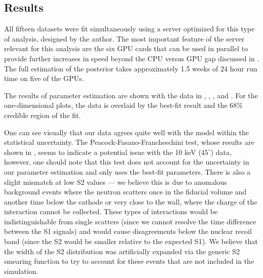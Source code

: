 \subsection{Results}
\label{sec:nerix_results}

All fifteen datasets were fit simultaneously using a server optimized for this type of analysis, designed by the author.  The most important feature of the server relevant for this analysis are the six GPU cards that can be used in parallel to provide further increases in speed beyond the CPU versus GPU gap discussed in .  The full estimation of the posterior takes approximately 1.5 weeks of 24 hour run time on five of the GPUs.


The results of parameter estimation are shown with the data in , , , and .  For the one-dimensional plots, the data is overlaid by the best-fit result and the 68\% credible region of the fit.  %



One can see visually that our data agrees quite well with the model within the statistical uncertainty.  The Peacock-Fasano-Francheschini test, whose results are shown in , seems to indicate a potential issue with the 10 keV ($45^{\circ}$) data, however, one should note that this test does not account for the uncertainty in our parameter estimation and only uses the best-fit parameters.  There is also a slight mismatch at low S2 values --- we believe this is due to anomalous background events where the neutron scatters once in the fiducial volume and another time below the cathode or very close to the wall, where the charge of the interaction cannot be collected.  These types of interactions would be indistinguishable from single scatters (since we cannot resolve the time difference between the S1 signals) and would cause disagreements below the nuclear recoil band (since the S2 would be smaller relative to the expected S1).  We believe that the width of the S2 distribution was artificially expanded via the generic S2 smearing function to try to account for these events that are not included in the simulation.






